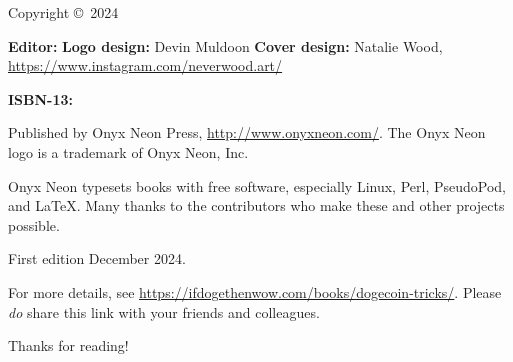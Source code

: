 \thispagestyle{empty}

\huge{\booktitle}
\newline
\large{\booksubtitle}
\newline
\newline
\normalsize

Copyright \copyright~2024 \bookauthor

\vfill
\textbf{Editor:} \bookauthor\newline
\textbf{Logo design:} Devin Muldoon\newline
\textbf{Cover design:} Natalie Wood, \url{https://www.instagram.com/neverwood.art/}

\textbf{ISBN-13:} \bookisbnthirteen

Published by Onyx Neon Press, \url{http://www.onyxneon.com/}.
The Onyx Neon logo is a trademark of Onyx Neon, Inc.

Onyx Neon typesets books with free software, especially Linux, Perl, PseudoPod,
and \LaTeX. Many thanks to the contributors who make these and other projects
possible.

First edition December 2024.

For more details, see \url{https://ifdogethenwow.com/books/dogecoin-tricks/}.
Please \emph{do} share this link with your friends and colleagues.

Thanks for reading!
